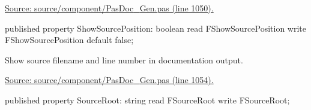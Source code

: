 \documentclass{report}
\newif\ifpdf
\begin{document}
\begin{list}{}
\begin{flushleft}
\ifpdf
\end{flushleft}
\fi


\par  \par
\href{https://github.com/pasdoc/pasdoc/blob/master/source/component/PasDoc_Gen.pas#L1050}{Source: source/component/PasDoc{\_}Gen.pas (line 1050).}\label{PasDoc_Gen.TDocGenerator-ShowSourcePosition}
\item[\textbf{ShowSourcePosition}\hfill]
\ifpdf
\begin{flushleft}
\fi
\begin{ttfamily}
published property ShowSourcePosition: boolean
      read FShowSourcePosition write FShowSourcePosition default false;\end{ttfamily}

\ifpdf
\end{flushleft}
\fi


\par Show source filename and line number in documentation output.\par
\href{https://github.com/pasdoc/pasdoc/blob/master/source/component/PasDoc_Gen.pas#L1054}{Source: source/component/PasDoc{\_}Gen.pas (line 1054).}\label{PasDoc_Gen.TDocGenerator-SourceRoot}
\item[\textbf{SourceRoot}\hfill]
\ifpdf
\begin{flushleft}
\fi
\begin{ttfamily}
published property SourceRoot: string
      read FSourceRoot write FSourceRoot;\end{ttfamily}

\ifpdf
\end{flushleft}
\fi



\end{list}
\end{document}
